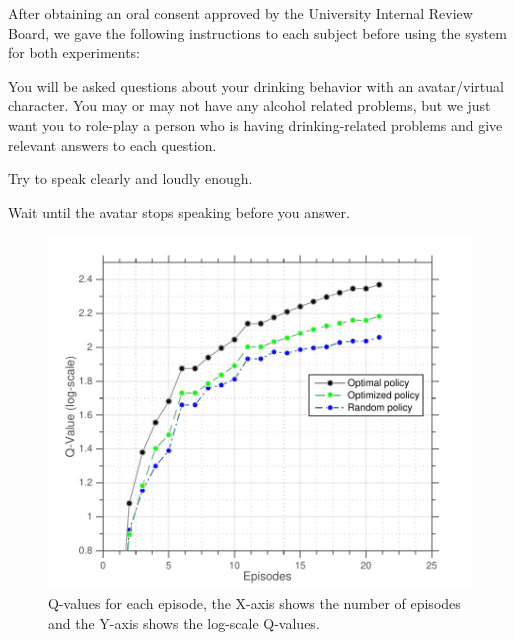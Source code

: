 \documentclass[letterpaper]{article}
\begin{document}
After obtaining an oral consent approved by the University Internal Review Board, we gave the following instructions to each subject before using the system for both experiments:
\begin{compactitem}
\item You will be asked questions about your drinking behavior with an avatar/virtual character.  You may or may not have any alcohol related problems, but we just want you to role-play a person who is having drinking-related problems and give relevant answers to each question.
\item Try to speak clearly and loudly enough.
\item Wait until the avatar stops speaking before you answer.\\
\end{compactitem} 
 \begin{figure}
 \centering
 \includegraphics[width=\columnwidth]{figures/q-values.pdf}
 \caption{Q-values for each episode, the X-axis shows the number of episodes and the Y-axis shows the log-scale Q-values.}
 \label{q-values}
 \end{figure}
\end{document}

